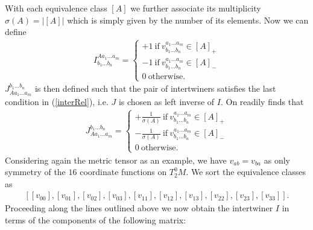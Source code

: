 \documentclass[a4paper,12pt, DIV=14, BCOR=5mm, twoside, headsepline]{scrbook}
\begin{document}
With each equivalence class $[A]$ we further associate its multiplicity $\sigma(A) = \vert [A] \vert$ which is simply given by the number of its elements.
Now we can define
\begin{align}\label{defI}
    I^{A a_1 ... a_m}_{b_1 ... b_n} = \begin{cases} +1 \ \text{if} \  v^{a_1 ... a_m}_{b_1 ... b_n} \in [A]_+ \\
    -1 \ \text{if} \  v^{a_1 ... a_m}_{b_1 ... b_n} \in [A]_-  \\
                       0 \  \text{otherwise}.
                            \end{cases}
\end{align}
$J^{b_1 ... b_n}_{A a_1 ... a_m}$ is then defined such that the pair of intertwiners satisfies the last condition in (\ref{interRel}), i.e. $J$ is chosen as left inverse of $I$. On readily finds that
\begin{align}\label{defJ}
    J^{b_1 ... b_n}_{A a_1 ... a_m} = \begin{cases}  +\frac{1}{\sigma(A)} \  \text{if} \  v^{a_1 ... a_m}_{b_1 ... b_n} \in [A]_+\\
    -\frac{1}{\sigma(A)} \  \text{if} \  v^{a_1 ... a_m}_{b_1 ... b_n} \in [A]_- \\ 
    0   \ \text{otherwise}.
    \end{cases}
\end{align}
Considering again the metric tensor as an example, we have $v_{ab} = v_{ba}$ as only symmetry of the $16$ coordinate functions on $T^0_2M$. We sort the equivalence classes as 
\begin{align}
    \left[[v_{00}], [v_{01}], [v_{02}], [v_{03}], [v_{11}], [v_{12}], [v_{13}], [v_{22}], [v_{23}], [v_{33}]\right ].
\end{align}
Proceeding along the lines outlined above we now obtain the intertwiner $I$ in terms of the components of the following matrix: 
\end{document}
